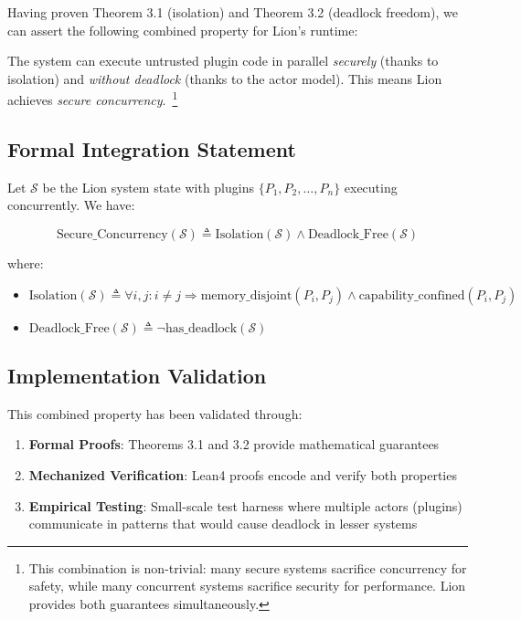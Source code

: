Having proven Theorem 3.1 (isolation) and Theorem 3.2 (deadlock freedom), we can assert the following combined property for Lion's runtime:

\begin{definition}
The system can execute untrusted plugin code in parallel \emph{securely} (thanks to isolation) and \emph{without deadlock} (thanks to the actor model). This means Lion achieves \emph{secure concurrency}.~\footnote{This combination is non-trivial: many secure systems sacrifice concurrency for safety, while many concurrent systems sacrifice security for performance. Lion provides both guarantees simultaneously.}
\end{definition}

\subsection{Formal Integration Statement}

Let $\mathcal{S}$ be the Lion system state with plugins $\{P_1, P_2, \ldots, P_n\}$ executing concurrently. We have:

\begin{equation}
\text{Secure\_Concurrency}(\mathcal{S}) \triangleq \text{Isolation}(\mathcal{S}) \land \text{Deadlock\_Free}(\mathcal{S})
\end{equation}

where:
\begin{itemize}
\item $\text{Isolation}(\mathcal{S}) \triangleq \forall i, j: i \neq j \Rightarrow \text{memory\_disjoint}(P_i, P_j) \land \text{capability\_confined}(P_i, P_j)$
\item $\text{Deadlock\_Free}(\mathcal{S}) \triangleq \neg \text{has\_deadlock}(\mathcal{S})$
\end{itemize}

\subsection{Implementation Validation}

This combined property has been validated through:

\begin{enumerate}
\item \textbf{Formal Proofs}: Theorems 3.1 and 3.2 provide mathematical guarantees
\item \textbf{Mechanized Verification}: Lean4 proofs encode and verify both properties
\item \textbf{Empirical Testing}: Small-scale test harness where multiple actors (plugins) communicate in patterns that would cause deadlock in lesser systems
\end{enumerate}

